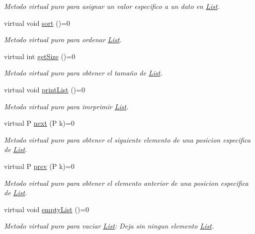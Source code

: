 \begin{DoxyCompactItemize}
\begin{DoxyCompactList}\small\item\em Metodo virtual puro para asignar un valor especifico a un dato en \hyperlink{class_list}{List}. \end{DoxyCompactList}\item 
virtual void \hyperlink{class_list_ae3795939f27cf3e688cd470450e0c27a}{sort} ()=0
\begin{DoxyCompactList}\small\item\em Metodo virtual puro para ordenar \hyperlink{class_list}{List}. \end{DoxyCompactList}\item 
virtual int \hyperlink{class_list_af213bbcf13ee436a0f04cde66e337672}{get\+Size} ()=0
\begin{DoxyCompactList}\small\item\em Metodo virtual puro para obtener el tamaño de \hyperlink{class_list}{List}. \end{DoxyCompactList}\item 
virtual void \hyperlink{class_list_a8b34931e187e7e6b86aad86510ce4f3b}{print\+List} ()=0
\begin{DoxyCompactList}\small\item\em Metodo virtual puro para imrprimir \hyperlink{class_list}{List}. \end{DoxyCompactList}\item 
virtual P \hyperlink{class_list_a4ec3e88e176bb45bc49b030d1c8abb3f}{next} (P k)=0
\begin{DoxyCompactList}\small\item\em Metodo virtual puro para obtener el siguiente elemento de una posicion especifica de \hyperlink{class_list}{List}. \end{DoxyCompactList}\item 
virtual P \hyperlink{class_list_acc1831ae92a288345ef20cb29f3846b2}{prev} (P k)=0
\begin{DoxyCompactList}\small\item\em Metodo virtual puro para obtener el elemento anterior de una posicion especifica de \hyperlink{class_list}{List}. \end{DoxyCompactList}\item 
virtual void \hyperlink{class_list_a24b4f177a70215980e81ef7b2981fa1e}{empty\+List} ()=0
\begin{DoxyCompactList}\small\item\em Metodo virtual puro para vaciar \hyperlink{class_list}{List}\+: Deja sin ningun elemento \hyperlink{class_list}{List}. \end{DoxyCompactList}\end{DoxyCompactItemize}
